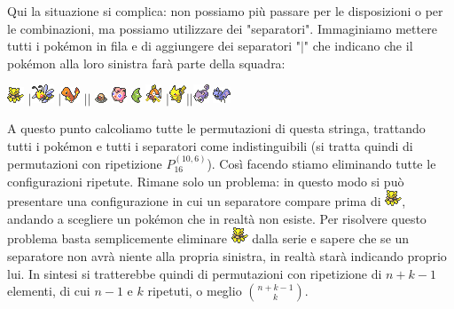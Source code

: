 \documentclass{article}     %
\begin{document}
            \begin{ex}

            Qui la situazione si complica: non possiamo più passare per le disposizioni o per le combinazioni, ma possiamo utilizzare dei "separatori". Immaginiamo mettere tutti i pokémon in fila e di aggiungere dei separatori "$|$" che indicano che il pokémon alla loro sinistra farà parte della squadra: 
            \begin{center}
                \includegraphics{pkmn/A.png} $|$\includegraphics{pkmn/B.png} $|$\includegraphics{pkmn/C.png} $|$$|$ \includegraphics{pkmn/D.png} \includegraphics{pkmn/J.png} \includegraphics{pkmn/M.png} \includegraphics{pkmn/MK.png} $|$\includegraphics{pkmn/P.png}$|$$|$\includegraphics{pkmn/R.png} \includegraphics{pkmn/Z.png}
            \end{center} 
            A questo punto calcoliamo tutte le permutazioni di questa stringa, trattando tutti i pokémon e tutti i separatori come indistinguibili (si tratta quindi di permutazioni con ripetizione $P_{16}^{(10,6)}$). Così facendo stiamo eliminando tutte le configurazioni ripetute. Rimane solo un problema: in questo modo si può presentare una configurazione in cui un separatore compare prima di \includegraphics{pkmn/A.png}, andando a scegliere un pokémon che in realtà non esiste. Per risolvere questo problema basta semplicemente eliminare \includegraphics{pkmn/A.png} dalla serie e sapere che se un separatore non avrà niente alla propria sinistra, in realtà starà indicando proprio lui. In sintesi si tratterebbe quindi di permutazioni con ripetizione di $n+k-1$ elementi, di cui $n-1$ e $k$ ripetuti, o meglio $\binom{n+k-1}{k}$.

\end{ex}
\end{document}

